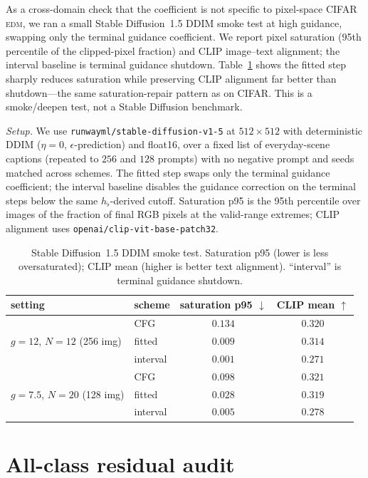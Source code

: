 \documentclass{article} %
\theoremstyle{plain}
\theoremstyle{definition}
\theoremstyle{remark}
\begin{document}
As a cross-domain check that the coefficient is not specific to pixel-space
CIFAR \textsc{edm}, we ran a small Stable Diffusion~1.5 DDIM smoke test at high
guidance, swapping only the terminal guidance coefficient.  We report pixel
saturation (95th percentile of the clipped-pixel fraction) and CLIP
image--text alignment; the interval baseline is terminal guidance shutdown.
Table~\ref{tab:ldm} shows the fitted step sharply reduces saturation while
preserving CLIP alignment far better than shutdown---the same saturation-repair
pattern as on CIFAR.  This is a smoke/deepen test, not a Stable Diffusion
benchmark.

\emph{Setup.}  We use \texttt{runwayml/stable-diffusion-v1-5} at
$512\times512$ with deterministic DDIM ($\eta=0$, $\epsilon$-prediction) and
float16, over a fixed list of everyday-scene captions (repeated to $256$ and
$128$ prompts) with no negative prompt and seeds matched across schemes.  The
fitted step swaps only the terminal guidance coefficient; the interval baseline
disables the guidance correction on the terminal steps below the same
$h_\flat$-derived cutoff.  Saturation p95 is the 95th percentile over images of
the fraction of final RGB pixels at the valid-range extremes; CLIP alignment
uses \texttt{openai/clip-vit-base-patch32}.

\begin{table}[ht]
\centering
\caption{Stable Diffusion~1.5 DDIM smoke test.  Saturation p95 (lower is less
oversaturated); CLIP mean (higher is better text alignment).  ``interval'' is
terminal guidance shutdown.}
\label{tab:ldm}
{\small
\begin{tabular}{llcc}
\toprule
setting & scheme & saturation p95 $\downarrow$ & CLIP mean $\uparrow$ \\
\midrule
\multirow{3}{*}{$g{=}12$, $N{=}12$ (256 img)}
 & CFG      & $0.134$ & $0.320$ \\
 & fitted   & $0.009$ & $0.314$ \\
 & interval & $0.001$ & $0.271$ \\
\midrule
\multirow{3}{*}{$g{=}7.5$, $N{=}20$ (128 img)}
 & CFG      & $0.098$ & $0.321$ \\
 & fitted   & $0.028$ & $0.319$ \\
 & interval & $0.005$ & $0.278$ \\
\bottomrule
\end{tabular}}
\end{table}
\FloatBarrier

\section{All-class residual audit}
\label{app:allclass}
\end{document}
